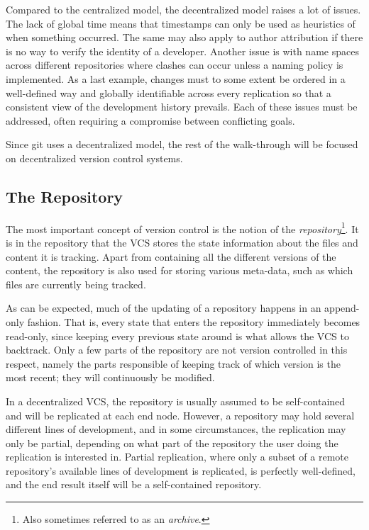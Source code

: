 Compared to the centralized model, the decentralized model raises a
lot of issues. The lack of global time means that timestamps can only
be used as heuristics of  when something occurred.  The same may also
apply to author attribution if there is no way to verify the identity
of a developer. Another issue is with name spaces across different
repositories where clashes can occur unless a naming policy is
implemented. As a last example, changes must to some extent be ordered
in a well-defined way and globally identifiable across every
replication so that a consistent view of the development history
prevails. Each of these issues must be addressed, often requiring a
compromise between conflicting goals.

Since git uses a decentralized model, the rest of the walk-through will be focused
on decentralized version control systems.

\subsection{The Repository}

The most important concept of version control is the notion of the
\emph{repository}\footnote{Also sometimes referred to as an
\emph{archive}.}.  It is in the repository that the VCS stores the
state information about the files and content it is tracking. Apart
from containing all the different versions of the content, the
repository is also used for storing various meta-data, such as which
files are currently being tracked.

As can be expected, much of the updating of a repository happens in an
append-only fashion. That is, every state that enters the repository
immediately becomes read-only, since keeping every previous state
around is what allows the VCS to backtrack. Only a few parts
of the repository are not version controlled in this respect, namely
the parts responsible of keeping track of which version is the most
recent; they will continuously be modified.

In a decentralized VCS, the repository is usually assumed to be
self-contained and will be replicated at each end
node. However, a repository may hold several different lines of
development, and in some circumstances, the replication may only be
partial, depending on what part of the repository the user doing
the replication is interested in. Partial replication, where only a
subset of a remote repository's available lines of development is
replicated, is perfectly well-defined, and the end result itself will be
a self-contained repository.

